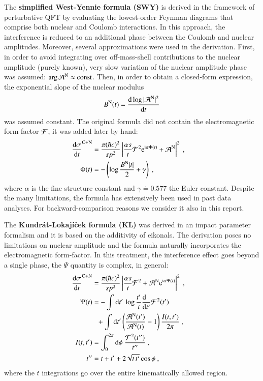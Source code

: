 The {\bf simplified West-Yennie formula (SWY)} \cite{wy68} is derived in the framework of perturbative QFT by evaluating the lowest-order Feynman diagrams that comprise both nuclear and Coulomb interactions. In this approach, the interference is reduced to an additional phase between the Coulomb and nuclear amplitudes. Moreover, several approximations were used in the derivation. First, in order to avoid integrating over off-mass-shell contributions to the nuclear amplitude (purely known), very slow variation of the nuclear amplitude phase was assumed: $\arg {\cal A}^{\rm N} \approx \hbox{const}$. Then, in order to obtain a closed-form expression, the exponential slope of the nuclear modulus
\begin{equation}
\label{eq:nuc slope}
B^{\rm N}(t) = {\d \log |{\cal A}^{\rm N}|^2 \over \d t}
\end{equation}
was assumed constant. The original formula did not contain the electromagnetic form factor ${\cal F}$, it was added later by hand:
\begin{equation}
\label{eq:int swy}
	\begin{aligned}
		{\d\sigma\over \d t}^{\rm C+N} &= {\pi (\hbar c)^2 \over s p^2} \left | {\alpha s\over t} {\cal F}^2 \e^{\I\alpha \Phi(t)} + {\cal A}^{\rm N} \right |^2\ ,\cr
		\Phi(t) &= - \left( \log {B^{\rm N} |t|\over 2} + \gamma \right)\ ,\cr
	\end{aligned}
\end{equation}
where $\alpha$ is the fine structure constant and $\gamma \doteq 0.577$ the Euler constant. Despite the many limitations, the formula has extensively been used in past data analyses. For backward-comparison reasons we consider it also in this report.

The {\bf Kundr\' at-Lokaj\' i\v cek formula (KL)} \cite{kl94} was derived in an impact parameter formalism and it is based on the additivity of eikonals. The derivation poses no limitations on nuclear amplitude and the formula naturally incorporates the electromagnetic form-factor. In this treatment, the interference effect goes beyond a single phase, the $\Psi$ quantity is complex, in general:
\begin{equation}
\label{eq:int kl}
	\begin{aligned}
		{\d\sigma\over \d t}^{\rm C+N} &= {\pi (\hbar c)^2 \over s p^2} \left | {\alpha s\over t} {\cal F}^2 + {\cal A}^{\rm N} \e^{\I\alpha \Psi(t)} \right |^2\ ,\cr
		\Psi(t) &= 
			- \int \d t'\, \log {t'\over t} {\d\phantom{t'}\over \d t'} {\cal F}^2(t') \cr
		&\phantom{=} + \int \d t' \left( {{\cal A}^{\rm N}(t') \over {\cal A}^{\rm N}(t)} - 1 \right) { I(t, t')\over 2\pi }
			\ ,\cr
		I(t, t') &= \int_0^{2\pi} \d\phi\ {{\cal F}^2(t'')\over t''}\ , \cr
		t'' &= t + t' + 2\sqrt{t\, t'} \cos\phi\ ,\cr
	\end{aligned}
\end{equation}
where the $t$ integrations go over the entire kinematically allowed region.

